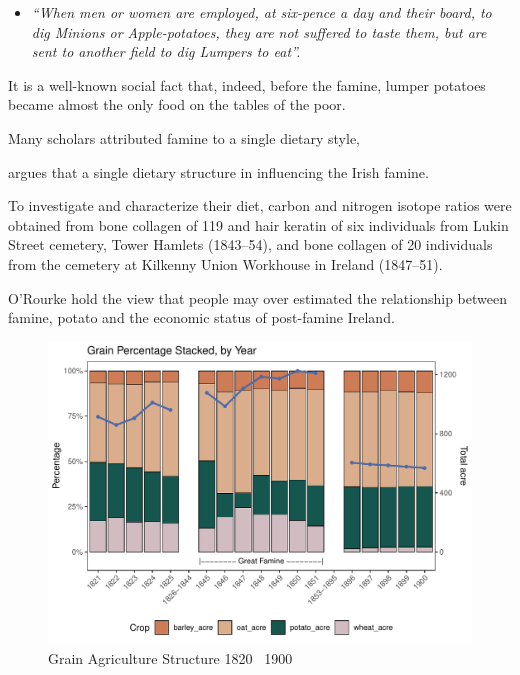 \begin{itemize}
    \item [] \textit{``When men or women are employed, at six-pence a day and their board, to dig Minions or Apple-potatoes, they are not suffered to taste them, but are sent to another field to dig Lumpers to eat''.}\citep{grada1995ireland}
\end{itemize}





It is a well-known social fact that, indeed, before the famine, lumper potatoes became almost the only food on the tables of the poor. 

Many scholars attributed famine to a single dietary style,

argues that a single dietary structure in influencing the Irish famine.\citep{braa1997great}


To investigate and characterize their diet, carbon and nitrogen isotope ratios were obtained from bone collagen of 119 and hair keratin of six individuals from Lukin Street cemetery, Tower Hamlets (1843–54), and bone collagen of 20 individuals from the cemetery at Kilkenny Union Workhouse in Ireland (1847–51).\citep{beaumont2013victims}

O'Rourke hold the view that people may over estimated the relationship between famine, potato and the economic status of post-famine Ireland\citep{o1994economic}.


\begin{figure}[htbp]
    \centering
    \caption{Grain Agriculture Structure 1820 \textendash\ 1900}
    \includegraphics[width=.95\textwidth]{../03_outputs/food_structure.pdf}
\end{figure}

